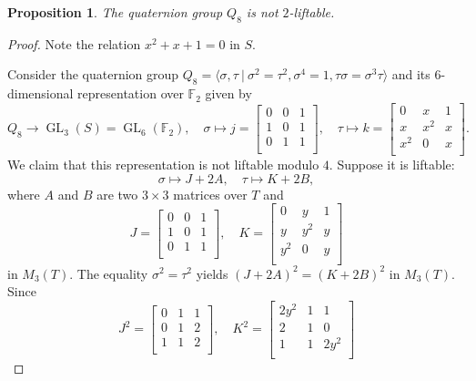 \documentclass[12pt]{amsart}
\numberwithin{equation}{section}
\newtheorem{proposition}[equation]{Proposition}
\theoremstyle{definition}
\renewcommand{\(}{\bigl(}
\renewcommand{\)}{\bigr)}
\newcommand{\GL}{\operatorname{GL}}
\newcommand{\F}{\mathbb{F}}
\begin{document}
\begin{proposition}\label{q8}
The quaternion group $Q_8$ is not $2$-liftable.
\end{proposition}

\begin{proof}

Note the relation $x^2+x+1=0$ in $S$.

Consider the quaternion group $Q_8=\langle \sigma, \tau\ |\ \sigma^2=\tau^2, \sigma^4=1, \tau\sigma=\sigma^3 \tau \rangle$ and its $6$-dimensional
representation over $\F_2$ given by
\[
 Q_8\to \GL_3(S)=\GL_6(\F_2),\quad \sigma\mapsto
j=\begin{bmatrix}
  0 &  0 & 1\\
 1 &  0 & 1\\
  0 &  1 & 1\\
\end{bmatrix}, \quad
 \tau\mapsto k=\begin{bmatrix}
0 &  x  & 1\\
 x &   {x}^2 &  x\\
{x}^2&   0 &  x \\
\end{bmatrix}.
 \]
 We claim that this representation is not liftable modulo $4$. Suppose it is liftable:
\[
\sigma\mapsto J+2  A,
\quad \tau\mapsto K+2 B,
\]
where $A$ and $B$ are two $3\times 3$ matrices over $T$ and
\[
J=\begin{bmatrix}
  0 &  0 & 1\\
 1 &  0 & 1\\
  0 &  1 & 1\\
\end{bmatrix},
\quad K=\begin{bmatrix}
0 &  y  & 1\\
  y &   {y}^2 &  y\\
{y}^2&   0 & y \\
\end{bmatrix}
\]
in $M_3(T)$.
The equality $\sigma^2=\tau^2$ yields $(J+2  A)^2= (K+2 B)^2$ in $M_3(T)$. Since
 \[
{J}^2=\begin{bmatrix}
  0 &  1 & 1\\
 0 &  1 & 2\\
  1 &  1 & 2\\
\end{bmatrix},
\quad {K}^2=\begin{bmatrix}
2{y}^2 &  1  & 1\\
  2 &   1 &  0\\
1 &  1 & 2{y}^2 \\

\end{bmatrix}\]
\end{proof}
\end{document}
